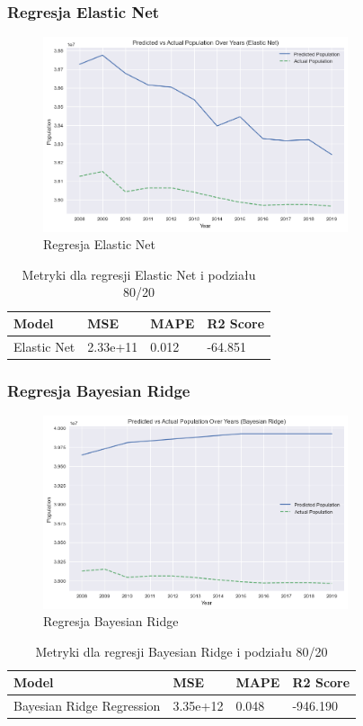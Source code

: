 \documentclass[11pt]{article}
\begin{document}
\subsubsection*{Regresja Elastic Net}
\begin{figure}[H]
        \centering
        \includegraphics[width=0.8\textwidth]{images/elastic_net.png}
        \caption{Regresja Elastic Net}
\end{figure}
\begin{table}[H]
        \centering
        \begin{tabular}{|l|l|l|l|}
        \hline
        Model & MSE & MAPE & R2 Score \\ \hline
        Elastic Net & 2.33e+11 & 0.012 & -64.851 \\ \hline
        \end{tabular}
        \caption{Metryki dla regresji Elastic Net i podziału 80/20}
\end{table}
\subsubsection*{Regresja Bayesian Ridge}
\begin{figure}[H]
        \centering
        \includegraphics[width=0.8\textwidth]{images/bayesian_ridge.png}
        \caption{Regresja Bayesian Ridge}
\end{figure}
\begin{table}[H]
        \centering
        \begin{tabular}{|l|l|l|l|}
        \hline
        Model & MSE & MAPE & R2 Score \\ \hline
        Bayesian Ridge Regression & 3.35e+12 & 0.048 & -946.190 \\ \hline
        \end{tabular}
        \caption{Metryki dla regresji Bayesian Ridge i podziału 80/20}
        \end{table}
\end{document}
